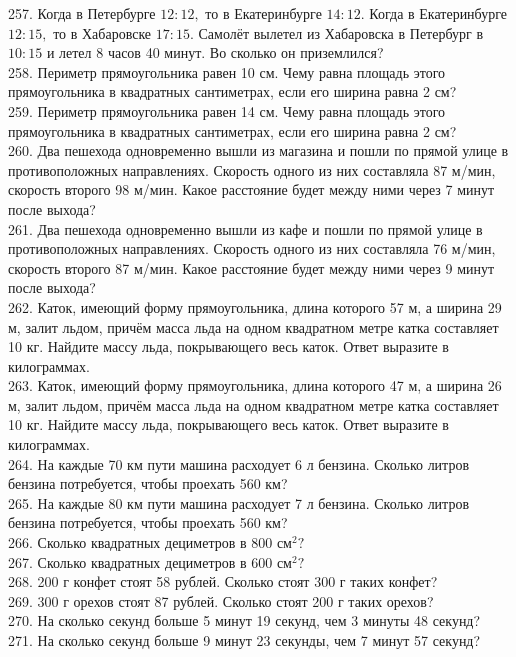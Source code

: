 257. Когда в Петербурге $12:12,$ то в Екатеринбурге $14:12.$ Когда в Екатеринбурге $12:15,$ то в Хабаровске $17:15.$ Самолёт вылетел из Хабаровска в Петербург в $10:15$ и летел 8 часов 40 минут. Во сколько он приземлился?\\
258. Периметр прямоугольника равен 10 см. Чему равна площадь этого прямоугольника в квадратных сантиметрах, если его ширина равна 2 см?\\
259. Периметр прямоугольника равен 14 см. Чему равна площадь этого прямоугольника в квадратных сантиметрах, если его ширина равна 2 см?\\
260. Два пешехода одновременно вышли из магазина и пошли по прямой улице в противоположных направлениях. Скорость одного из них составляла 87 м/мин, скорость второго 98 м/мин. Какое расстояние будет между ними через 7 минут после выхода?\\
261. Два пешехода одновременно вышли из кафе и пошли по прямой улице в противоположных направлениях. Скорость одного из них составляла 76 м/мин, скорость второго 87 м/мин. Какое расстояние будет между ними через 9 минут после выхода?\\
262. Каток, имеющий форму прямоугольника, длина которого 57 м, а ширина 29 м, залит льдом, причём масса льда на одном квадратном метре катка составляет 10 кг. Найдите массу льда, покрывающего весь каток. Ответ выразите в килограммах.\\
263. Каток, имеющий форму прямоугольника, длина которого 47 м, а ширина 26 м, залит льдом, причём масса льда на одном квадратном метре катка составляет 10 кг. Найдите массу льда, покрывающего весь каток. Ответ выразите в килограммах.\\
264. На каждые 70 км пути машина расходует 6 л бензина. Сколько литров бензина потребуется, чтобы проехать 560 км?\\
265. На каждые 80 км пути машина расходует 7 л бензина. Сколько литров бензина потребуется, чтобы проехать 560 км?\\
266. Сколько квадратных дециметров в $800\text{ см}^2?$\\
267. Сколько квадратных дециметров в $600\text{ см}^2?$\\
268. 200 г конфет стоят 58 рублей. Сколько стоят 300 г таких конфет?\\
269. 300 г орехов стоят 87 рублей. Сколько стоят 200 г таких орехов?\\
270. На сколько секунд больше 5 минут 19 секунд, чем 3 минуты 48 секунд?\\
271. На сколько секунд больше 9 минут 23 секунды, чем 7 минут 57 секунд?\\
